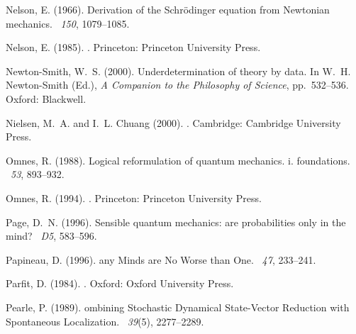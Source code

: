 \documentclass[12pt]{article}
\begin{document}
\begin{thebibliography}{}
Nelson, E. (1966).
\newblock Derivation of the {S}chr{\"o}dinger equation from {N}ewtonian
  mechanics.
~{\em 150}, 1079--1085.

Nelson, E. (1985).
.
\newblock Princeton: Princeton University Press.

Newton-Smith, W.~S. (2000).
\newblock Underdetermination of theory by data.
\newblock In W.~H. Newton-Smith (Ed.), {\em A Companion to the Philosophy of
  Science}, pp.\  532--536. Oxford: Blackwell.

Nielsen, M.~A. and I.~L. Chuang (2000).
.
\newblock Cambridge: Cambridge University Press.

Omnes, R. (1988).
\newblock Logical reformulation of quantum mechanics. i. foundations.
~{\em 53}, 893--932.

Omnes, R. (1994).
.
\newblock Princeton: Princeton University Press.

Page, D.~N. (1996).
\newblock Sensible quantum mechanics: are probabilities only in the mind?
~{\em D5}, 583--596.

Papineau, D. (1996).
any {M}inds are {N}o {W}orse than {O}ne.
~{\em 47},
  233--241.

Parfit, D. (1984).
.
\newblock Oxford: Oxford University Press.

Pearle, P. (1989).
ombining {S}tochastic {D}ynamical {S}tate-{V}ector {R}eduction
  with {S}pontaneous {L}ocalization.
~{\em 39\/}(5), 2277--2289.


\end{thebibliography}
\end{document}
